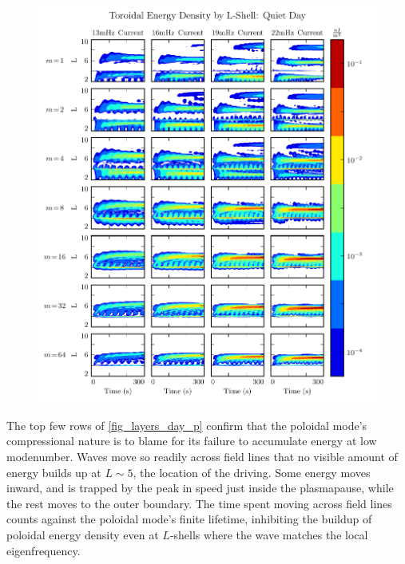 \begin{figure}[!htb]
    \centering
    \includegraphics[width=\textwidth]{figures/layers_day_t.pdf}
    \caption[Dayside Toroidal Energy Distribution]{
    }
    \label{fig_layers_day_t}
\end{figure}

The top few rows of \cref{fig_layers_day_p} confirm that the poloidal mode's compressional nature is to blame for its failure to accumulate energy at low modenumber. Waves move so readily across field lines that no visible amount of energy builds up at $L \sim 5$, the location of the driving. Some energy moves inward, and is trapped by the peak in \Alfven speed just inside the plasmapause, while the rest moves to the outer boundary. The time spent moving across field lines counts against the poloidal mode's finite lifetime, inhibiting the buildup of poloidal energy density even at $L$-shells where the wave matches the local eigenfrequency. 

